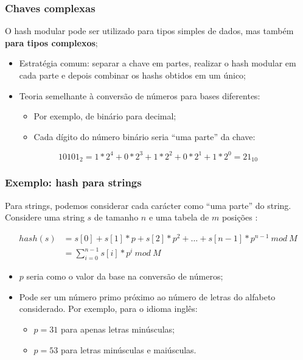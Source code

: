 \documentclass{beamer}
\begin{document}
\begin{frame}
  \frametitle{Chaves complexas}

  O hash modular pode ser utilizado para tipos simples de dados, mas também \textbf{para tipos complexos};
  \begin{itemize}
    \item Estratégia comum: separar a chave em partes, realizar o hash modular em cada parte e depois combinar os hashs obtidos em um único;
    \item Teoria semelhante à conversão de números para bases diferentes:
    \begin{itemize}
      \item Por exemplo, de binário para decimal;
      \item Cada dígito do número binário seria ``uma parte'' da chave:
    \end{itemize}
  \end{itemize}
  
  \[ 10101_{2} = 1 * 2^4 + 0 * 2^3 + 1 * 2^2 + 0 * 2^1 + 1 * 2^0 = 21_{10} \]

\end{frame}

\begin{frame}
  \frametitle{Exemplo: hash para strings}

  Para strings, podemos considerar cada carácter como ``uma parte'' do string. Considere uma string $s$ de tamanho $n$ e uma tabela de $m$ posições \cite{cpalg}:

  \begin{equation} \label{eq1}
    \begin{split}
      hash(s) & = s[0] + s[1]*p + s[2]*p^2 + \ldots + s[n−1]*p^{n-1}~mod~M \\
      & = \sum_{i=0}^{n-1}{s[i] * p^{i}}~mod~M
    \end{split}
	\end{equation}

  \begin{itemize}
    \item $p$ seria como o valor da base na conversão de números;
    \item Pode ser um número primo próximo ao número de letras do alfabeto considerado. Por exemplo, para o idioma inglês:
      \begin{itemize}
        \item $p = 31$ para apenas letras minúsculas;
        \item $p = 53$ para letras minúsculas e maiúsculas.
      \end{itemize}
  \end{itemize}

\end{frame}
\end{document}
